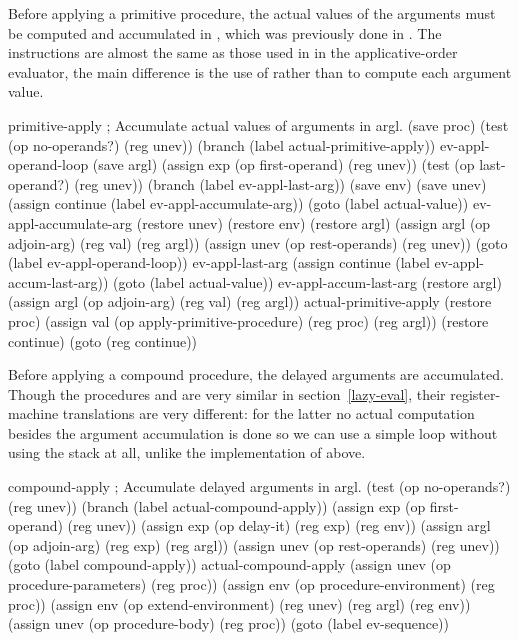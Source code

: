 \begin{exe}[5.25]
    Before applying a primitive procedure, the actual values of the arguments 
    must be computed and accumulated in , which was previously done 
    in . The instructions are almost the same as those used 
    in  in the applicative-order evaluator, the main 
    difference is the use of  rather than 
     to compute each argument value.
    \begin{cscm}
    primitive-apply
        ; Accumulate actual values of arguments in argl.
        (save proc)
        (test (op no-operands?) (reg unev))
        (branch (label actual-primitive-apply))
    ev-appl-operand-loop
        (save argl)
        (assign exp (op first-operand) (reg unev))
        (test (op last-operand?) (reg unev))
        (branch (label ev-appl-last-arg))
        (save env)
        (save unev)
        (assign continue (label ev-appl-accumulate-arg))
        (goto (label actual-value))
    ev-appl-accumulate-arg
        (restore unev)
        (restore env)
        (restore argl)
        (assign argl (op adjoin-arg) (reg val) (reg argl))
        (assign unev (op rest-operands) (reg unev))
        (goto (label ev-appl-operand-loop))
    ev-appl-last-arg
        (assign continue (label ev-appl-accum-last-arg))
        (goto (label actual-value))
    ev-appl-accum-last-arg
        (restore argl)
        (assign argl (op adjoin-arg) (reg val) (reg argl))
    actual-primitive-apply
        (restore proc)
        (assign val (op apply-primitive-procedure) (reg proc) (reg argl))
        (restore continue)
        (goto (reg continue))
    \end{cscm}

    Before applying a compound procedure, the delayed arguments are accumulated. 
    Though the procedures  and 
     are very similar in section~\ref{lazy-eval}, 
    their register-machine translations are very different: for the latter no 
    actual computation besides the argument accumulation is done so we can use 
    a simple loop without using the stack at all, unlike the implementation of 
     above.
    \begin{cscm}
    compound-apply
        ; Accumulate delayed arguments in argl.
        (test (op no-operands?) (reg unev))
        (branch (label actual-compound-apply))
        (assign exp (op first-operand) (reg unev))
        (assign exp (op delay-it) (reg exp) (reg env))
        (assign argl (op adjoin-arg) (reg exp) (reg argl))
        (assign unev (op rest-operands) (reg unev))
        (goto (label compound-apply))
    actual-compound-apply
        (assign unev (op procedure-parameters) (reg proc))
        (assign env (op procedure-environment) (reg proc))
        (assign env (op extend-environment) (reg unev) (reg argl) (reg env))
        (assign unev (op procedure-body) (reg proc))
        (goto (label ev-sequence))
    \end{cscm}
\end{exe}

